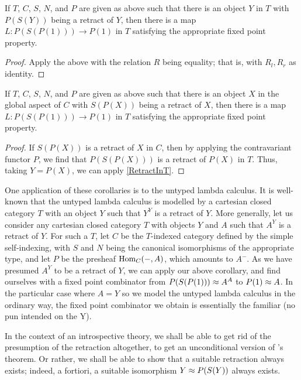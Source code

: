 \begin{corollary}\label{RetractInT}
If $T$, $C$, $S$, $N$, and $P$ are given as above such that there is an object $Y$ in $T$ with $P(S(Y))$ being a retract of $Y$, then there is a map $L : P(S(P(1))) \to P(1)$ in $T$ satisfying the appropriate fixed point property.
\end{corollary}
\begin{proof}
Apply the above with the relation $R$ being equality; that is, with $R_l, R_r$ as identity.
\end{proof}

\begin{corollary}\label{RetractInC}
If $T$, $C$, $S$, $N$, and $P$ are given as above such that there is an object $X$ in the global aspect of $C$ with $S(P(X))$ being a retract of $X$, then there is a map $L : P(S(P(1))) \to P(1)$ in $T$ satisfying the appropriate fixed point property.
\end{corollary}
\begin{proof}
If $S(P(X))$ is a retract of $X$ in $C$, then by applying the contravariant functor $P$, we find that $P(S(P(X)))$ is a retract of $P(X)$ in $T$. Thus, taking $Y = P(X)$, we can apply \cref{RetractInT}.
\end{proof}

\begin{observation}\label{YCombinator}
One application of these corollaries is to the untyped lambda calculus. It is well-known that the untyped lambda calculus is modelled by a cartesian closed category $T$ with an object $Y$ such that $Y^Y$ is a retract of $Y$. More generally, let us consider any cartesian closed category $T$ with objects $Y$ and $A$ such that $A^Y$ is a retract of $Y$. For such a $T$, let $C$ be the $T$-indexed category defined by the simple self-indexing, with $S$ and $N$ being the canonical isomorphisms of the appropriate type, and let $P$ be the presheaf $\operatorname{Hom}_C(-, A)$, which amounts to $A^{-}$. As we have presumed $A^Y$ to be a retract of $Y$, we can apply our above corollary, and find ourselves with a fixed point combinator from $P(S(P(1))) \approx A^A$ to $P(1) \approx A$. In the particular case where $A = Y$ so we model the untyped lambda calculus in the ordinary way, the fixed point combinator we obtain is essentially the familiar  (no pun intended on the Y).
\end{observation}

In the context of an introspective theory, we shall be able to get rid of the presumption of the retraction altogether, to get an unconditional version of \Loeb's theorem. Or rather, we shall be able to show that a suitable retraction always exists; indeed, a fortiori, a suitable isomorphism $Y \approx P(S(Y))$ always exists.

